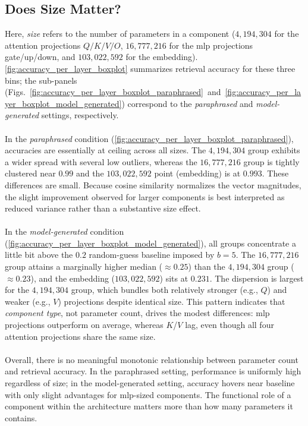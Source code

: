 \subsection{Does Size Matter?}
Here, \emph{size} refers to the number of parameters in a component ($4{,}194{,}304$ for the attention projections $Q/K/V/O$,
$16{,}777{,}216$ for the \acrshort{mlp} projections gate/up/down, and $103{,}022{,}592$ for the embedding). \autoref{fig:accuracy_per_layer_boxplot} summarizes retrieval accuracy for these three bins; the sub-panels
(Figs.~\ref{fig:accuracy_per_layer_boxplot_paraphrased}~and~\ref{fig:accuracy_per_layer_boxplot_model_generated}) correspond to the \emph{paraphrased} and \emph{model-generated} settings, respectively.
\\\\
In the \emph{paraphrased} condition (\autoref{fig:accuracy_per_layer_boxplot_paraphrased}), accuracies are essentially at ceiling across all sizes. The $4{,}194{,}304$ group exhibits a wider spread with several low outliers, whereas the $16{,}777{,}216$ group is tightly clustered near $0.99$ and the $103{,}022{,}592$ point (embedding) is at $0.993$. These differences are small. Because cosine similarity normalizes the vector magnitudes, the slight improvement observed for larger components is best interpreted as reduced variance rather than a substantive size effect.
\\\\
In the \emph{model-generated} condition
(\autoref{fig:accuracy_per_layer_boxplot_model_generated}), all groups concentrate a little bit above the $0.2$ random-guess baseline imposed by $b{=}5$. The $16{,}777{,}216$ group attains a marginally higher median ($\approx 0.25$) than the $4{,}194{,}304$ group ($\approx 0.23$), and the embedding ($103{,}022{,}592$) sits at $0.231$. The dispersion is largest for the $4{,}194{,}304$ group, which bundles both relatively stronger (e.g., $Q$) and weaker (e.g., $V$) projections despite identical size. This pattern indicates that \emph{component type}, not parameter count, drives the modest differences: \acrshort{mlp} projections outperform on average, whereas $K$/$V$ lag, even though all four attention projections share the same size.
\\\\
Overall, there is no meaningful monotonic relationship between parameter count and retrieval accuracy. In the paraphrased setting, performance is uniformly high regardless of size; in the model-generated setting, accuracy hovers near baseline with only slight advantages for \acrshort{mlp}-sized components. The functional role of a component within the architecture matters more than how many parameters it contains.
